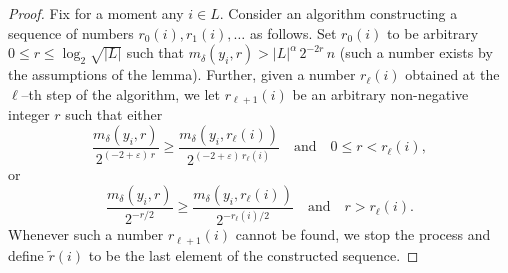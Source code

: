 \documentclass[11pt]{amsart}
\theoremstyle{definition}
\theoremstyle{plain}
\begin{document}
\begin{proof}
Fix for a moment any $i\in L$.
Consider an algorithm constructing a sequence of numbers
$r_0(i),r_1(i),\dots$ as follows.
Set $r_0(i)$ to be arbitrary $0\leq r\leq \log_2 \sqrt{|L|}$
such that $m_\delta(y_i,r)
>
|L|^{\alpha}\,2^{-2r}\,n$
(such a number exists by the assumptions of the lemma).
Further, given a number $r_\ell(i)$ obtained at the $\ell$--th
step of the algorithm, 
we let $r_{\ell+1}(i)$ be an arbitrary non-negative integer $r$
such that either
\begin{equation}\label{eq:aokjbfoaskfjnpfkajn}
\frac{m_\delta(y_i,r)}
{2^{(-2+\varepsilon)\,r}}
\geq \frac{m_\delta(y_i,r_\ell(i))}
{2^{(-2+\varepsilon)\,r_{\ell}(i)}}
\quad\mbox{and}\quad
0\leq r< r_\ell(i),    
\end{equation}
or
\begin{equation}\label{eq:alkdshjfbsofhjbsofjh}
\frac{m_\delta(y_i,r)}
{2^{-r/2}}
\geq
\frac{m_\delta(y_i,r_\ell(i))}{2^{-r_{\ell}(i)/2}}
\quad\mbox{and}\quad
r> r_\ell(i).
\end{equation}
Whenever such a number $r_{\ell+1}(i)$
cannot be found, we stop the process and define $\tilde r(i)$
to be the last element of the constructed sequence.


\end{proof}
\end{document}
